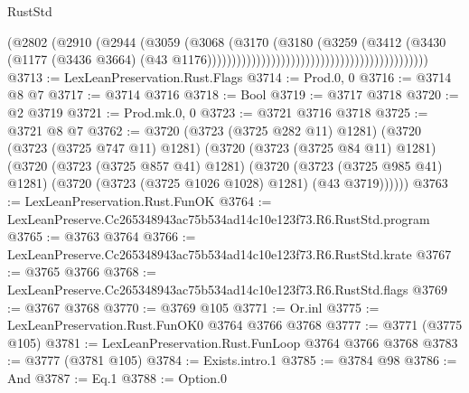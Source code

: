 \begin{lexlean}{RustStd}
\begin{coremodule}
                                                                      (@2802
                                                                        (@2910
                                                                          (@2944
                                                                            (@3059
                                                                              (@3068
                                                                                (@3170
                                                                                  (@3180
                                                                                    (@3259
                                                                                      (@3412
                                                                                        (@3430
                                                                                          (@1177
                                                                                            (@3436
                                                                                              @3664)
                                                                                            (@43
                                                                                              @1176)))))))))))))))))))))))))))))))))))))))))))))
@3713 := LexLeanPreservation.Rust.Flags
@3714 := Prod.{0, 0}
@3716 := @3714 @8 @7
@3717 := @3714 @3716
@3718 := Bool
@3719 := @3717 @3718
@3720 := @2 @3719
@3721 := Prod.mk.{0, 0}
@3723 := @3721 @3716 @3718
@3725 := @3721 @8 @7
@3762 := @3720
    (@3723 (@3725 @282 @11) @1281)
    (@3720
      (@3723 (@3725 @747 @11) @1281)
      (@3720
        (@3723 (@3725 @84 @11) @1281)
        (@3720
          (@3723 (@3725 @857 @41) @1281)
          (@3720
            (@3723 (@3725 @985 @41) @1281)
            (@3720 (@3723 (@3725 @1026 @1028) @1281) (@43 @3719))))))
@3763 := LexLeanPreservation.Rust.FunOK
@3764 := LexLeanPreserve.Cc265348943ac75b534ad14c10e123f73.R6.RustStd.program
@3765 := @3763 @3764
@3766 := LexLeanPreserve.Cc265348943ac75b534ad14c10e123f73.R6.RustStd.krate
@3767 := @3765 @3766
@3768 := LexLeanPreserve.Cc265348943ac75b534ad14c10e123f73.R6.RustStd.flags
@3769 := @3767 @3768
@3770 := @3769 @105
@3771 := Or.inl
@3775 := LexLeanPreservation.Rust.FunOK0 @3764 @3766 @3768
@3777 := @3771 (@3775 @105)
@3781 := LexLeanPreservation.Rust.FunLoop @3764 @3766 @3768
@3783 := @3777 (@3781 @105)
@3784 := Exists.intro.{1}
@3785 := @3784 @98
@3786 := And
@3787 := Eq.{1}
@3788 := Option.{0}

\end{coremodule}
\end{lexlean}
